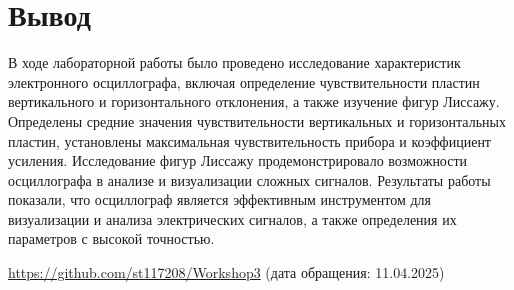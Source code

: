 \section{Вывод}

В ходе лабораторной работы было проведено исследование характеристик электронного осциллографа, включая определение чувствительности пластин вертикального и горизонтального отклонения, а также изучение фигур Лиссажу. Определены средние значения чувствительности вертикальных и горизонтальных пластин, установлены максимальная чувствительность прибора и коэффициент усиления. Исследование фигур Лиссажу продемонстрировало возможности осциллографа в анализе и визуализации сложных сигналов. Результаты работы показали, что осциллограф является эффективным инструментом для визуализации и анализа электрических сигналов, а также определения их параметров с высокой точностью.

\begin{thebibliography}{9}
\url{https://github.com/st117208/Workshop3}  (дата обращения: 11.04.2025)
\end{thebibliography}